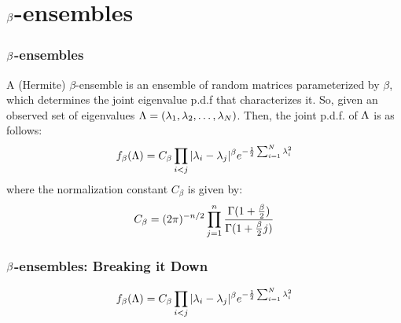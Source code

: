 

\section{$\b$-ensembles}

\begin{frame} \frametitle{$\b$-ensembles}

\begin{alertblock}{}
A (Hermite) $\beta$-ensemble is an ensemble of random matrices parameterized by $\beta$, which determines the joint eigenvalue p.d.f that characterizes it.
So, given an observed set of eigenvalues $\L = (\seqo[N]{\lambda})$. Then, the joint p.d.f. of $\L$ is as follows:
\begin{align*}
\jepdf = C_\beta \prod_{i < j} |\lambda_i - \lambda_j|^\beta e^{-\frac{1}{2} \sum_{i=1}^N \lambda_i^2}
\end{align*}
where the normalization constant $C_\beta$ is given by:
\begin{align*}
C_{\beta} = (2\pi)^{-n/2} \prod_{j = 1}^n \frac{\Gamma(1 + \frac{\b}{2})}{\Gamma(1 + \frac{\b}{2}j)}
\end{align*}
\end{alertblock}

\end{frame}
\begin{frame} \frametitle{$\b$-ensembles: Breaking it Down}
  \begin{align*}
  \jepdf = C_\beta \prod_{i < j} |\lambda_i - \lambda_j|^\beta e^{-\frac{1}{2} \sum_{i=1}^N \lambda_i^2}
  \end{align*}
\end{frame}
